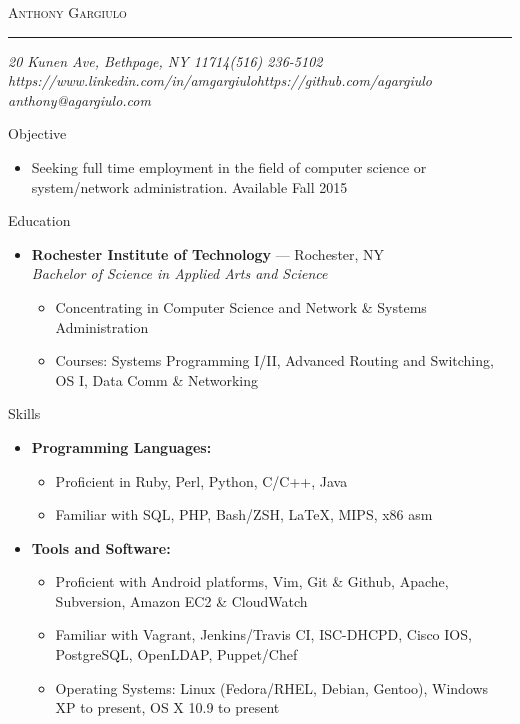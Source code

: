 \documentclass[10pt,oneside]{article}
\makeatletter
\newcommand{\name}{Anthony Gargiulo}
\newcommand{\addr}{20 Kunen Ave, Bethpage, NY 11714}
\newcommand{\mobilePhone}{(516) 236-5102}
\newcommand{\email}{anthony@agargiulo.com}
\newcommand{\github}{https://github.com/agargiulo}
\newcommand{\linkedin}{https://www.linkedin.com/in/amgargiulo}
\newcommand{\bigname}[1]{
	\begin{center}\fontfamily{bch}\selectfont\Huge\scshape#1\end{center}
}
\newenvironment{ressection}[1]{
	\vspace{3pt}
	{\fontfamily{bch}\selectfont\Large#1}
	\begin{itemize}
	\vspace{2pt}
}{
	\end{itemize}
}
\newcommand{\resitem}[1]{
	\vspace{-2pt}
	\item \begin{flushleft} #1 \end{flushleft}
}
\newcommand{\ressubitem}[1]{
	\vspace{-1pt}
	\item \begin{flushleft} #1 \end{flushleft}
}
\newcommand{\resbigitem}[3]{
	\vspace{-3pt}
	\item
	\textbf{#1} --- #2 \\
	\textit{#3}
}
\newenvironment{ressubsec}[3]{
	\resbigitem{#1}{#2}{#3}
	\vspace{-1pt}
	\begin{itemize}
}{
	\end{itemize}
}
\newenvironment{reslist}[1]{
	\resitem{\textbf{#1}}
	\vspace{-3pt}
	\begin{itemize}
}{
	\end{itemize}
}
\makeatother
\begin{document}
 \selectfont

\bigname{\name}

\vspace{-4pt} \rule{\textwidth}{1pt}

\vspace{-1pt} {\normalsize\itshape \addr \hfill \mobilePhone \\ \linkedin \hfill \github \\ \email}

\vspace{15 pt}



\begin{ressection}{Objective}

	\ressubitem{Seeking full time employment in the field of computer science or system/network administration. Available Fall 2015}

\end{ressection}


\begin{ressection}{Education}

	\begin{ressubsec}{Rochester Institute of Technology}{Rochester, NY}{Bachelor of Science in Applied Arts and Science}
		\ressubitem{Concentrating in Computer Science and Network \& Systems Administration}
		\ressubitem{Courses: Systems Programming I/II, Advanced Routing and Switching, OS I, Data Comm \& Networking}
	\end{ressubsec}

\end{ressection}


\begin{ressection}{Skills}


	\begin{reslist}{Programming Languages:}
		\ressubitem{Proficient in Ruby, Perl, Python, C/C++, Java}
		\ressubitem{Familiar with SQL, PHP, Bash/ZSH, \LaTeX, MIPS, x86 asm}
	\end{reslist}

	\begin{reslist}{Tools and Software:}
		\ressubitem{Proficient with Android platforms, Vim, Git \& Github, Apache, Subversion, Amazon EC2 \& CloudWatch}
		\ressubitem{Familiar with Vagrant, Jenkins/Travis CI, ISC-DHCPD, Cisco IOS, PostgreSQL, OpenLDAP, Puppet/Chef}
		\ressubitem{Operating Systems: Linux (Fedora/RHEL, Debian, Gentoo), Windows XP to present, OS X 10.9 to present}
	\end{reslist}

\end{ressection}
\end{document}

